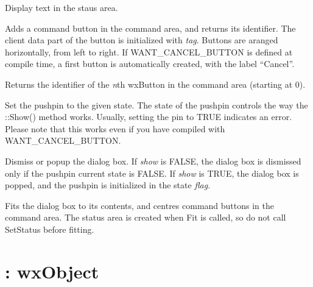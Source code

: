 Display text in the staus area.




Adds a command button in the command area, and returns its identifier. The
client data part of the button is initialized with {\it tag}.
Buttons are aranged horizontally, from left to right. If WANT\_CANCEL\_BUTTON
is defined at compile time, a first button is automatically created, with
the label ``Cancel''.



Returns the identifier of the {\it n}th wxButton in the command area
(starting at 0).



Set the pushpin to the given state. The state of the pushpin controls the way
the ::Show() method works. Usually, setting the pin to TRUE indicates an
error. Please note that this works even if you have compiled with
WANT\_CANCEL\_BUTTON.



Dismiss or popup the dialog box. If {\it show} is FALSE, the dialog box
is dismissed only if the pushpin current state is FALSE. If {\it show}\rtfsp
is TRUE, the dialog box is popped, and the pushpin is initialized in the
state {\it flag}.

\label{wxenhdialogfit}


Fits the dialog box to its contents, and centres command buttons in the
command area. The status area is created when Fit is called, so do not
call SetStatus before fitting.

\section{: wxObject}\label{wxevent}

